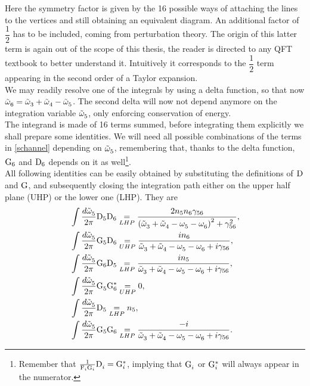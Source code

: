 Here the symmetry factor is given by the 16 possible ways of attaching the lines to the vertices and still  obtaining an equivalent diagram. 
An additional factor of $\dfrac{1}{2}$ has to be included, coming from perturbation theory. The origin of this latter term is again out of the scope of this thesis, the reader is directed
to any QFT textbook to better understand it. Intuitively it corresponds to the $\dfrac{1}{2}$ term appearing in the second order of a Taylor expansion. \\
We may readily resolve one of the integrals by using a delta function, so that now $\tilde{\omega}^{}_6 = \tilde{\omega}^{}_3 + \tilde{\omega}^{}_4 - \tilde{\omega}^{}_5$. The second delta will now not depend 
anymore on the integration variable $\tilde{\omega}^{}_5$, only enforcing conservation of energy. \\
The integrand is made of 16 terms summed, before integrating them explicitly we shall prepare some identities. We will need all possible combinations of 
the terms in \eqref{schannel} depending on $\tilde{\omega}^{}_5$, remembering that, thanks to the delta function, $\mathrm{G}_6$ and $\mathrm{D}_6$ depends on it as well\footnote{
    Remember that $\frac{1}{\mathrm{F}_i \mathrm{G}_i}\mathrm{D}^{}_i = \mathrm{G}_i^*$, implying that $\mathrm{G}^{}_i$ or $\mathrm{G}^{*}_i$ will always appear in the numerator.
}. \\
All following identities can be easily obtained by substituting the definitions of $\mathrm{D}$ and $\mathrm{G}$, and subsequently closing the integration path either 
on the upper half plane (UHP) or the lower one (LHP). They are
\begin{align}
    &\int \frac{d\tilde{\omega}^{}_5}{2\pi} \mathrm{D}_5 \mathrm{D}_6 \underset{LHP}{=} \frac{2n_5n_6\gamma_{56}}{\left( \tilde{\omega}^{}_3 + \tilde{\omega}^{}_4 - \omega^{}_5 - \omega^{}_6\right)^2 + \gamma^2_{56}}, 
    \label{identity1}\\
    &\int \frac{d\tilde{\omega}^{}_5}{2\pi} \mathrm{G}_5 \mathrm{D}_6 \underset{UHP}{=} \frac{in_6}{\tilde{\omega}^{}_3 + \tilde{\omega}^{}_4 - \omega^{}_5 - \omega^{}_6 +i\gamma_{56}}, \\
    &\int \frac{d\tilde{\omega}^{}_5}{2\pi} \mathrm{G}_6 \mathrm{D}_5 \underset{LHP}{=} \frac{in_5}{\tilde{\omega}^{}_3 + \tilde{\omega}^{}_4 - \omega^{}_5 - \omega^{}_6 +i\gamma_{56}}, \\
    &\int \frac{d\tilde{\omega}^{}_5}{2\pi} \mathrm{G}_5^{} \mathrm{G}_6^* \underset{UHP}{=} 0, \\
    &\int \frac{d\tilde{\omega}^{}_5}{2\pi} \mathrm{D}_5 \underset{LHP}{=} n_5, \label{identity5}\\
    &\int \frac{d\tilde{\omega}^{}_5}{2\pi} \mathrm{G}_5\mathrm{G}_6 \underset{LHP}{=} \frac{-i}{\tilde{\omega}^{}_3 + \tilde{\omega}^{}_4 - \omega^{}_5 - \omega^{}_6 +i\gamma_{56}}.
    \label{identity6}
\end{align}  
